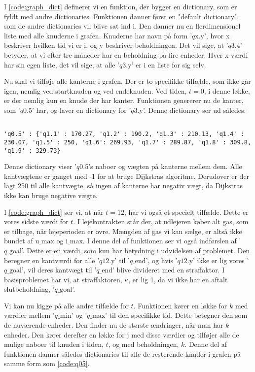 I \autoref{code:graph_dict} definerer vi en funktion, der bygger en dictionary, som er fyldt med andre dictionaries. Funktionen danner først en "default dictionary", som de andre dictionaries vil blive sat ind i.
Den danner nu en flerdimensionel liste med alle knuderne i grafen. Knuderne har navn på form '$q\textrm{x.y}$', hvor x beskriver hvilken tid vi er i, og y beskriver beholdningen. Det vil sige, at '$q3.4$' betyder, at vi efter tre måneder har en beholdning på fire enheder. Hver x-værdi har sin egen liste, det vil sige, at alle '$q\textrm{3.y}$' er i en liste for sig selv.

Nu skal vi tilføje alle kanterne i grafen. Der er to specifikke tilfælde, som ikke går igen, nemlig ved startknuden og ved endeknuden. Ved tiden, $t=0$, i denne løkke, er der nemlig kun en knude der har kanter. Funktionen genererer nu de kanter, som '$q\textrm{0.5}$' har, og laver en dictionary for '$q\textrm{3.y}$'. 
Denne dictionary ser ud således:

\begin{lstlisting}[label=code:q05, caption=Dictionary for $q \textrm{0.5}$.]

'q0.5' : {'q1.1' : 170.27, 'q1.2' : 190.2, 'q1.3' : 210.13, 'q1.4' : 230.07, 'q1.5' : 250, 'q1.6': 269.93, 'q1.7' : 289.87, 'q1.8' : 309.8, 'q1.9' : 329.73}
\end{lstlisting}
Denne dictionary viser '$q0.5$'s naboer og vægten på kanterne mellem dem. Alle kantvægtene er ganget med -1 for at bruge Dijkstras algoritme. Derudover er der lagt 250 til alle kantvægte, så ingen af kanterne har negativ vægt, da Dijkstras ikke kan bruge negative vægte. 

I \autoref{code:graph_dict} ser vi, at når $t=12$, har vi også et specielt tilfælde. Dette er vores sidste værdi for $t$. I lejekontrakten står der, at udlejeren køber alt gas, som er tilbage, når lejeperioden er ovre. Mængden af gas vi kan sælge, er altså ikke bundet af $\textrm{u\_max}$ og $\textrm{i\_max}$. I denne del af funktionen ser vi også indførslen af '$q\textrm{\_goal}$'. Dette er en værdi, som kun har betydning i udvidelsen af problemet. Den beregner  en kantværdi for alle '$q\textrm{12.y}$' til '$q\textrm{\_end}$', og hvis '$q\textrm{12.y}$' ikke er lig vores '$q\textrm{\_goal}$', vil deres kantvægt til '$q\textrm{\_end}$' blive divideret med en straffaktor. I basisproblemet har vi, at straffaktoren, $\kappa$, er lig 1, da vi ikke har en aftalt slutbeholdning, '$q\textrm{\_goal}$'.

Vi kan nu kigge på alle andre tilfælde for $t$. Funktionen kører en løkke for $k$ med værdier mellem '$q\textrm{\_min}$' og '$q\textrm{\_max}$' til den specifikke tid. Dette betegner den som de nuværende enheder.
Den finder nu de største ændringer, når man har $k$ enheder. Den kører derefter en løkke for $\textrm{j}$ med disse værdier og tilføjer alle de mulige naboer til knuden i tiden, $t$, og med beholdningen, $k$. Denne del af funktionen danner således dictionaries til alle de resterende knuder i grafen på samme form som \autoref{code:q05}.

